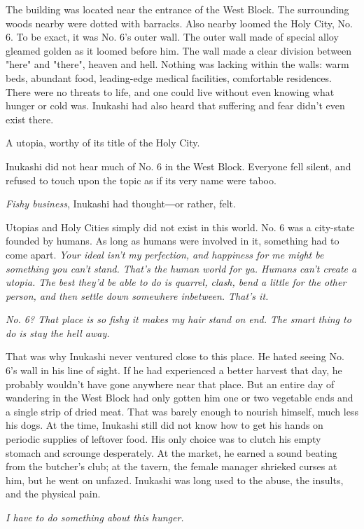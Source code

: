 The building was located near the entrance of the West Block. The
surrounding woods nearby were dotted with barracks. Also nearby loomed
the Holy City, No. 6. To be exact, it was No. 6's outer wall. The outer
wall made of special alloy gleamed golden as it loomed before him. The
wall made a clear division between "here" and "there", heaven and hell.
Nothing was lacking within the walls: warm beds, abundant food,
leading-edge medical facilities, comfortable residences. There were no
threats to life, and one could live without even knowing what hunger or
cold was. Inukashi had also heard that suffering and fear didn't even
exist there.

A utopia, worthy of its title of the Holy City.

Inukashi did not hear much of No. 6 in the West Block. Everyone fell
silent, and refused to touch upon the topic as if its very name were
taboo.

\emph{Fishy business}, Inukashi had thought―or rather, felt.

Utopias and Holy Cities simply did not exist in this world. No. 6 was a
city-state founded by humans. As long as humans were involved in it,
something had to come apart. \emph{Your ideal isn't my perfection, and
happiness for me might be something you can't stand. That's the human
world for ya. Humans can't create a utopia. The best they'd be able to
do is quarrel, clash, bend a little for the other person, and then
settle down somewhere inbetween. That's it.}

\emph{No. 6? That place is so fishy it makes my hair stand on end. The smart
thing to do is stay the hell away.}

That was why Inukashi never ventured close to this place. He hated
seeing No. 6's wall in his line of sight. If he had experienced a better
harvest that day, he probably wouldn't have gone anywhere near that
place. But an entire day of wandering in the West Block had only gotten
him one or two vegetable ends and a single strip of dried meat. That was
barely enough to nourish himself, much less his dogs. At the time,
Inukashi still did not know how to get his hands on periodic supplies of
leftover food. His only choice was to clutch his empty stomach and
scrounge desperately. At the market, he earned a sound beating from the
butcher's club; at the tavern, the female manager shrieked curses at
him, but he went on unfazed. Inukashi was long used to the abuse, the
insults, and the physical pain.

\emph{I have to do something about this hunger.}

